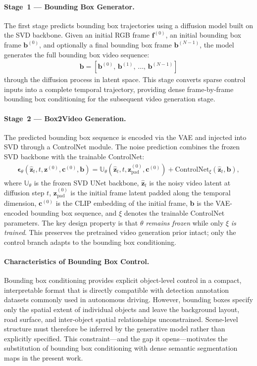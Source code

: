 \paragraph{Stage~1 --- Bounding Box Generator.}
The first stage predicts bounding box trajectories using a diffusion model built on the SVD backbone. Given an initial RGB frame $\mathbf{f}^{(0)}$, an initial bounding box frame $\mathbf{b}^{(0)}$, and optionally a final bounding box frame $\mathbf{b}^{(N-1)}$, the model generates the full bounding box video sequence:
\begin{align}
    \mathbf{b} = \left[\mathbf{b}^{(0)},\, \mathbf{b}^{(1)},\, \ldots,\, \mathbf{b}^{(N-1)}\right]
    \label{eq:bbox_sequence}
\end{align}
through the diffusion process in latent space. This stage converts sparse control inputs into a complete temporal trajectory, providing dense frame-by-frame bounding box conditioning for the subsequent video generation stage.

\paragraph{Stage~2 --- Box2Video Generation.}
The predicted bounding box sequence is encoded via the VAE and injected into SVD through a ControlNet module. The noise prediction combines the frozen SVD backbone with the trainable ControlNet:
\begin{align}
    \boldsymbol{\epsilon}_\theta(\hat{\mathbf{z}}_t, t, \mathbf{z}^{(0)}, \mathbf{c}^{(0)}, \mathbf{b}) = \mathbb{U}_\theta\!\left(\hat{\mathbf{z}}_t, t, \mathbf{z}^{(0)}_{\text{pad}}, \mathbf{c}^{(0)}\right) + \text{ControlNet}_\xi(\hat{\mathbf{z}}_t, \mathbf{b}),
    \label{eq:ctrlv_box2video}
\end{align}
where $\mathbb{U}_\theta$ is the frozen SVD UNet backbone, $\hat{\mathbf{z}}_t$ is the noisy video latent at diffusion step $t$, $\mathbf{z}^{(0)}_{\text{pad}}$ is the initial frame latent padded along the temporal dimension, $\mathbf{c}^{(0)}$ is the CLIP embedding of the initial frame, $\mathbf{b}$ is the VAE-encoded bounding box sequence, and $\xi$ denotes the trainable ControlNet parameters. The key design property is that $\theta$ \emph{remains frozen} while only $\xi$ \emph{is trained}. This preserves the pretrained video generation prior intact; only the control branch adapts to the bounding box conditioning.

\paragraph{Characteristics of Bounding Box Control.}
Bounding box conditioning provides explicit object-level control in a compact, interpretable format that is directly compatible with detection annotation datasets commonly used in autonomous driving. However, bounding boxes specify only the spatial extent of individual objects and leave the background layout, road surface, and inter-object spatial relationships unconstrained. Scene-level structure must therefore be inferred by the generative model rather than explicitly specified. This constraint---and the gap it opens---motivates the substitution of bounding box conditioning with dense semantic segmentation maps in the present work.

